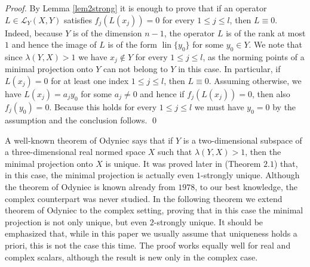 \documentclass[12pt, reqno]{amsart}
\theoremstyle{definition}
\theoremstyle{remark}
\numberwithin{equation}{section}
\DeclareMathOperator{\lin}{lin}
\begin{document}
\emph{Proof.} By Lemma \ref{lem2strong} it is enough to prove that if an operator $L \in \mathcal{L}_Y(X, Y)$ satisfies $f_j(L(x_j))=0$ for every $1 \leq j \leq l$, then $L \equiv 0$. Indeed, because $Y$ is of the dimension $n-1$, the operator $L$ is of the rank at most $1$ and hence the image of $L$ is of the form $\lin\{y_0\}$ for some $y_0 \in Y$. We note that since $\lambda(Y, X)>1$ we have $x_j \not \in Y$ for every $1 \leq j \leq l$, as the norming points of a minimal projection onto $Y$ can not belong to $Y$ in this case. In particular, if $L(x_j)=0$ for at least one index $1 \leq j \leq l$, then $L \equiv 0$. Assuming otherwise, we have $L(x_j)=a_jy_0$ for some $a_j \neq 0$ and hence if $f_j(L(x_j))=0$, then also $f_j(y_0)=0$. Because this holds for every $1 \leq j \leq l$ we must have $y_0=0$ by the assumption and the conclusion follows. \qed


A well-known theorem of Odyniec \cite{odinec2} says that if $Y$ is a two-dimensional subspace of a three-dimensional real normed space $X$ such that $\lambda(Y, X)>1$, then the minimal projection onto $X$ is unique. It was proved later in \cite{lewicki} (Theorem $2.1$) that, in this case, the minimal projection is actually even $1$-strongly unique. Although the theorem of Odyniec is known already from $1978$, to our best knowledge, the complex counterpart was never studied. In the following theorem we extend theorem of Odyniec to the complex setting, proving that in this case the minimal projection is not only unique, but even $2$-strongly unique. It should be emphasized that, while in this paper we usually assume that uniqueness holds a priori, this is not the case this time. The proof works equally well for real and complex scalars, although the result is new only in the complex case.
\end{document}
